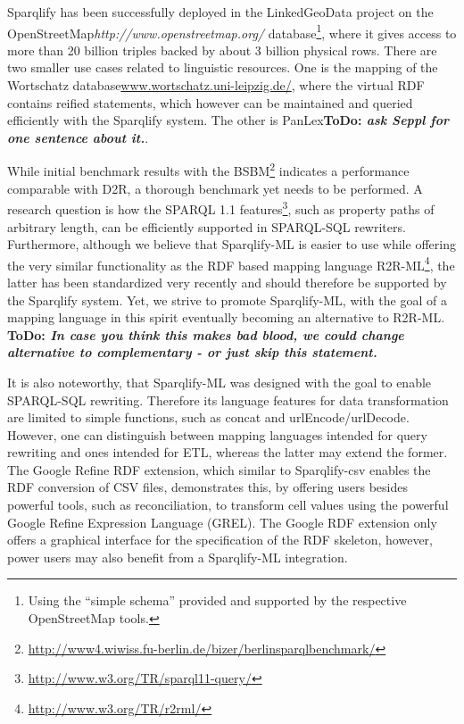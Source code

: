 \documentclass[a4paper,twoside,bibtotoc,abstracton,12pt,BCOR=15mm]{scrreprt}
\newcommand{\todo}[1]{\textbf{ToDo: \textit{#1}}}
\begin{document}
Sparqlify has been successfully deployed in the LinkedGeoData project on the
OpenStreetMap\emph{http://www.openstreetmap.org/}
database\footnote{Using the ``simple schema'' provided and supported by the respective OpenStreetMap tools.},
where it gives access to more than 20 billion triples backed by about 3 billion physical rows.
There are two smaller use cases related to linguistic resources. 
One is the mapping of the Wortschatz database\url{www.wortschatz.uni-leipzig.de/}, where the virtual RDF contains reified statements, which however can be maintained and queried efficiently with the Sparqlify system.
The other is PanLex\todo{ask Seppl for one sentence about it.}.


While initial benchmark results with the BSBM\footnote{\url{http://www4.wiwiss.fu-berlin.de/bizer/berlinsparqlbenchmark/}} indicates a performance comparable with D2R, a thorough benchmark yet needs to be performed.
A research question is how the SPARQL 1.1 features\footnote{\url{http://www.w3.org/TR/sparql11-query/}}, such as property paths of arbitrary length, can be efficiently supported in SPARQL-SQL rewriters.
Furthermore, although we believe that Sparqlify-ML is easier to use while offering the very similar functionality as the RDF based mapping language R2R-ML\footnote{\url{http://www.w3.org/TR/r2rml/}},
the latter has been standardized very recently and should therefore be supported by the Sparqlify system. Yet, we strive to promote Sparqlify-ML,
with the goal of a mapping language in this spirit eventually becoming an alternative to R2R-ML.
\todo{In case you think this makes bad blood, we could change alternative to complementary - or just skip this statement.} 

It is also noteworthy, that Sparqlify-ML was designed with the goal to enable SPARQL-SQL rewriting.
Therefore its language features for data transformation are limited to simple functions,
such as concat and urlEncode/urlDecode.
However, one can distinguish between mapping languages intended for query rewriting and ones intended for
ETL, whereas the latter may extend the former.
The Google Refine RDF extension, which similar to Sparqlify-csv enables the RDF conversion of CSV files,
demonstrates this, by offering users besides powerful tools, such as reconciliation, to transform cell values using the powerful Google Refine Expression Language (GREL).  
The Google RDF extension only offers a graphical interface for the specification of the RDF skeleton, however, power users
may also benefit from a Sparqlify-ML integration.
\end{document}

